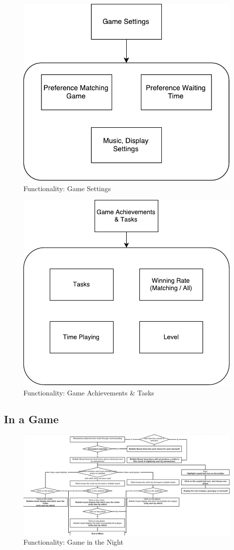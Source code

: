 \documentclass[11pt]{article}
\begin{document}
\begin{figure}
\centering
\includegraphics[width=0.7\linewidth, keepaspectratio]{func-settings.pdf}
\caption{Functionality: Game Settings}
\label{fig:func-settings}
\end{figure}

\begin{figure}
\centering
\includegraphics[width=0.7\linewidth, keepaspectratio]{func-tasks.pdf}
\caption{Functionality: Game Achievements \& Tasks}
\label{fig:func-tasks}
\end{figure}

\subsection{In a Game}

\begin{figure}
\centering
\includegraphics[width=0.7\linewidth, keepaspectratio]{func-gamenight.png}
\caption{Functionality: Game in the Night}
\label{fig:func-gamenight}
\end{figure}
\end{document}
